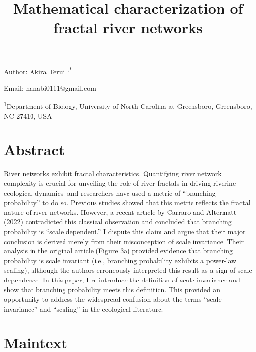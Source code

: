 \documentclass[
  12pt,
]{article}
\title{Mathematical characterization of fractal river networks}
\author{}
\date{\vspace{-2.5em}}
\begin{document}
\maketitle

Author: Akira Terui\textsuperscript{1,*}

Email: hanabi0111@gmail.com

\textsuperscript{1}Department of Biology, University of North Carolina at Greensboro, Greensboro, NC 27410, USA

\hypertarget{abstract}{%
\section{Abstract}\label{abstract}}

River networks exhibit fractal characteristics. Quantifying river network complexity is crucial for unveiling the role of river fractals in driving riverine ecological dynamics, and researchers have used a metric of ``branching probability'' to do so. Previous studies showed that this metric reflects the fractal nature of river networks. However, a recent article by Carraro and Altermatt (2022) contradicted this classical observation and concluded that branching probability is ``scale dependent.'' I dispute this claim and argue that their major conclusion is derived merely from their misconception of scale invariance. Their analysis in the original article (Figure 3a) provided evidence that branching probability is scale invariant (i.e., branching probability exhibits a power-law scaling), although the authors erroneously interpreted this result as a sign of scale dependence. In this paper, I re-introduce the definition of scale invariance and show that branching probability meets this definition. This provided an opportunity to address the widespread confusion about the terms ``scale invariance'' and ``scaling'' in the ecological literature.

\hypertarget{maintext}{%
\section{Maintext}\label{maintext}}
\end{document}
